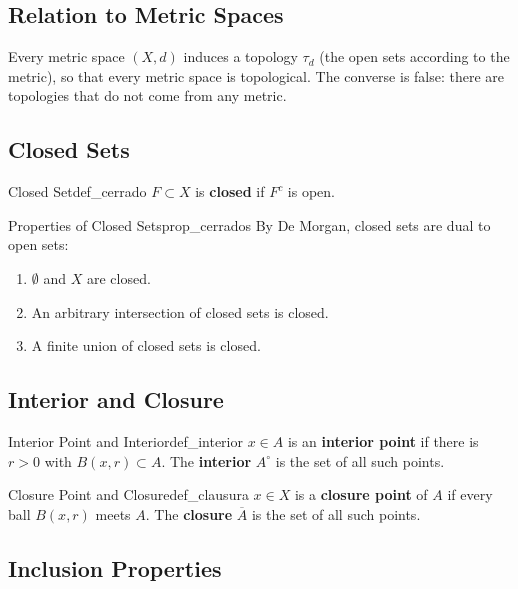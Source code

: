 \documentclass[11pt, a4paper]{article}
\begin{document}
\subsection{Relation to Metric Spaces}

Every metric space $(X, d)$ induces a topology $\tau_d$ (the open sets according to the metric), so
that every metric space is topological. The converse is false: there are topologies that do not come from
any metric. 

\subsection{Closed Sets}

\begin{definicion}{Closed Set}{def_cerrado}
$F \subset X$ is \textbf{closed} if $F^c$ is open.
\end{definicion}

\begin{proposicion}{Properties of Closed Sets}{prop_cerrados}
By De Morgan, closed sets are dual to open sets:
\begin{enumerate}
    \item $\emptyset$ and $X$ are closed.
    \item An arbitrary intersection of closed sets is closed.
    \item A finite union of closed sets is closed.
\end{enumerate}
\end{proposicion}

\subsection{Interior and Closure}

\begin{definicion}{Interior Point and Interior}{def_interior}
$x \in A$ is an \textbf{interior point} if there is $r > 0$ with $B(x, r) \subset A$. The \textbf{interior}
$A^\circ$ is the set of all such points.
\end{definicion}

\begin{definicion}{Closure Point and Closure}{def_clausura}
$x \in X$ is a \textbf{closure point} of $A$ if every ball $B(x, r)$ meets $A$. The \textbf{closure}
$\overline{A}$ is the set of all such points.
\end{definicion}

\subsection{Inclusion Properties}
\end{document}
